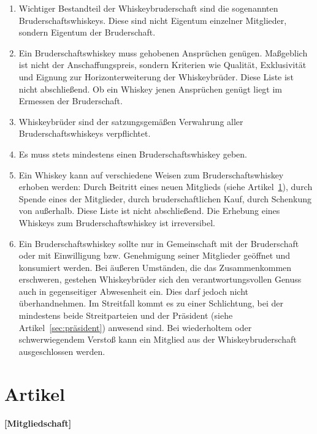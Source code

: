 \documentclass[a4paper,12pt]{scrartcl}
\begin{document}
\begin{enumerate}

\item Wichtiger Bestandteil der Whiskeybruderschaft sind die sogenannten Bruderschaftswhiskeys.
  Diese sind nicht Eigentum einzelner Mitglieder, sondern Eigentum der Bruderschaft.

\item Ein Bruderschaftswhiskey muss gehobenen Ansprüchen genügen. Maßgeblich ist nicht der
  Anschaffungspreis, sondern Kriterien wie Qualität, Exklusivität und Eignung zur
  Horizonterweiterung der Whiskeybrüder. Diese Liste ist nicht abschließend. Ob ein Whiskey jenen
  Ansprüchen genügt liegt im Ermessen der Bruderschaft.

\item Whiskeybrüder sind der satzungsgemäßen Verwahrung aller Bruderschaftswhiskeys verpflichtet.

\item Es muss stets mindestens einen Bruderschaftswhiskey geben.

\item Ein Whiskey kann auf verschiedene Weisen zum Bruderschaftswhiskey erhoben werden: Durch
  Beitritt eines neuen Mitglieds (siehe Artikel~\ref{sec:mitgliedschaft}), durch Spende eines der
  Mitglieder, durch bruderschaftlichen Kauf, durch Schenkung von außerhalb. Diese Liste ist nicht
  abschließend. Die Erhebung eines Whiskeys zum Bruderschaftswhiskey ist irreversibel.

\item Ein Bruderschaftswhiskey sollte nur in Gemeinschaft mit der Bruderschaft oder mit Einwilligung
  bzw. Genehmigung seiner Mitglieder geöffnet und konsumiert werden. Bei äußeren Umständen, die das
  Zusammenkommen erschweren, gestehen Whiskeybrüder sich den verantwortungsvollen Genuss auch in
  gegenseitiger Abwesenheit ein. Dies darf jedoch nicht überhandnehmen. Im Streitfall kommt es zu
  einer Schlichtung, bei der mindestens beide Streitparteien und der Präsident (siehe
  Artikel~\ref{sec:präsident}) anwesend sind. Bei wiederholtem oder schwerwiegendem Verstoß kann ein
  Mitglied aus der Whiskeybruderschaft ausgeschlossen werden.

\end{enumerate}



\section{Artikel \thesection}
\label{sec:mitgliedschaft}
\textbf{[Mitgliedschaft]}
\end{document}
